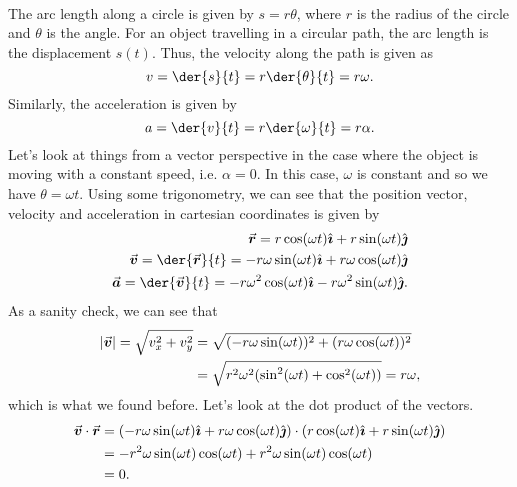 \documentclass[../newtonian_mechanics.tex]{subfiles}
\begin{document}
        \paragraph{}
        The arc length along a circle is given by $s=r\theta$, where $r$ is the radius of the circle and $\theta$ is the angle.
        For an object travelling in a circular path, the arc length is the displacement $s(t)$.
        Thus, the velocity along the path is given as
        \begin{equation}
            v=\der{s}{t}=r\der{\theta}{t}=r\omega.
        \end{equation}
        Similarly, the acceleration is given by
        \begin{equation}
            a=\der{v}{t}=r\der{\omega}{t}=r\alpha.
        \end{equation}
        Let's look at things from a vector perspective in the case where the object is moving with a constant speed, i.e. $\alpha=0$.
        In this case, $\omega$ is constant and so we have $\theta=\omega t$.
        Using some trigonometry, we can see that the position vector, velocity and acceleration in cartesian coordinates is given by
        \begin{align}
            \vect{r}=r\cos(\omega t)\ihat+r\sin(\omega t)\jhat\\
            \vect{v}=\der{\vect{r}}{t}=-r\omega\sin(\omega t)\ihat+r\omega\cos(\omega t)\jhat\\
            \vect{a}=\der{\vect{v}}{t}=-r\omega^2\cos(\omega t)\ihat-r\omega^2\sin(\omega t)\jhat.
        \end{align}
        As a sanity check, we can see that
        \begin{align}
            \lvert\vec{\boldsymbol v}\rvert=\sqrt{v_x^2+v_y^2}&=\sqrt{(-r\omega\sin(\omega t))^2+(r\omega\cos(\omega t))^2}\\
            &=\sqrt{r^2\omega^2(\sin^2(\omega t)+\cos^2(\omega t))}=r\omega,
        \end{align}
        which is what we found before.
        Let's look at the dot product of the vectors.
        \begin{align}
            \vec{\boldsymbol v}\cdot\vec{\boldsymbol r}&=(-r\omega\sin(\omega t)\hat{\boldsymbol{\imath}}+r\omega\cos(\omega t)\hat{\boldsymbol{\jmath}})\cdot(r\cos(\omega t)\hat{\boldsymbol{\imath}}+r\sin(\omega t)\hat{\boldsymbol{\jmath}})\\
            &=-r^2\omega\sin(\omega t)\cos(\omega t)+r^2\omega\sin(\omega t)\cos(\omega t)\\
            &=0.
        \end{align}
\end{document}
